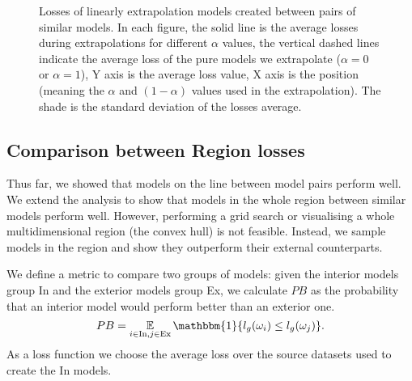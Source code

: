 \documentclass[nohyperref]{article}
\theoremstyle{plain}
\theoremstyle{definition}
\theoremstyle{remark}
\begin{document}
\begin{figure*}[t]
\centering
{}
\hfill
{}
\hfill
{}
\caption{Losses of linearly extrapolation models created between pairs of similar models. In each figure, the solid line is the average losses during extrapolations for different $ \alpha $ values, the vertical dashed lines indicate the average loss of the pure models we extrapolate ($\alpha=0$ or $\alpha=1$), Y axis is the average loss value, X axis is the position (meaning the $ \alpha$ and $(1-\alpha) $ values used in the extrapolation). The shade is the standard deviation of the losses average.} 
\label{fig:extrapolation}
\end{figure*}


\subsection{Comparison between Region losses}\label{sec:loss_metric}

Thus far, we showed that models on the line between model pairs perform well. We extend the analysis to show that models in the whole region between similar models perform well. However, performing a grid search or visualising a whole multidimensional region (the convex hull) is not feasible. Instead, we sample models in the region and show they outperform their external counterparts. 

We define a metric to compare two groups of models: given the interior models group In and the exterior models group Ex, we calculate $PB$ as the probability that an interior model would perform better than an exterior one.
\begin{equation*}\label{equation:PB}
PB=\mathop{{}\mathbb{E}}_{i\in \text{In}, j\in \text{Ex}}\mathbbm{1}\{l_g(\omega_i)\le l_g(\omega_j)\}.    
\end{equation*}
As a loss function we choose the average loss over the source datasets used to create the In models.
\end{document}
